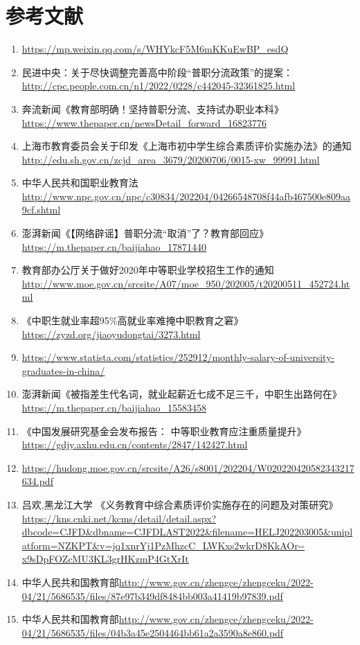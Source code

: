 \documentclass[12pt,UTF8]{ctexart}
\begin{document}
\section{参考文献}
\begin{enumerate}[1.]
	\item \url{https://mp.weixin.qq.com/s/WHYkcF5M6mKKuEwBP_esdQ}
	\item 民进中央：关于尽快调整完善高中阶段“普职分流政策”的提案：\url{http://cpc.people.com.cn/n1/2022/0228/c442045-32361825.html}
	\item 奔流新闻《教育部明确！坚持普职分流、支持试办职业本科》 \url{https://www.thepaper.cn/newsDetail_forward_16823776}
	\item 上海市教育委员会关于印发《上海市初中学生综合素质评价实施办法》的通知\url{http://edu.sh.gov.cn/zcjd_area_3679/20200706/0015-xw_99991.html}
	\item 中华人民共和国职业教育法\url{http://www.npc.gov.cn/npc/c30834/202204/04266548708f44afb467500e809aa9cf.shtml}
	\item 澎湃新闻《【网络辟谣】普职分流“取消”了？教育部回应》\url{https://m.thepaper.cn/baijiahao_17871440}
	\item 教育部办公厅关于做好2020年中等职业学校招生工作的通知\url{http://www.moe.gov.cn/srcsite/A07/moe_950/202005/t20200511_452724.html}
	\item 《中职生就业率超95\%高就业率难掩中职教育之窘》\url{https://zyzd.org/jiaoyudongtai/3273.html}
	\item \url{https://www.statista.com/statistics/252912/monthly-salary-of-university-graduates-in-china/}
	\item 澎湃新闻《被指差生代名词，就业起薪近七成不足三千，中职生出路何在》\url{https://m.thepaper.cn/baijiahao_15583458}
	\item 《中国发展研究基金会发布报告： 中等职业教育应注重质量提升》 \url{https://gdjy.axhu.edu.cn/contents/2847/142427.html}
	\item \url{https://hudong.moe.gov.cn/srcsite/A26/s8001/202204/W020220420582343217634.pdf}
	\item 吕欢,黑龙江大学 《义务教育中综合素质评价实施存在的问题及对策研究》\url{https://kns.cnki.net/kcms/detail/detail.aspx?dbcode=CJFD&dbname=CJFDLAST2022&filename=HELJ202203005&uniplatform=NZKPT&v=jq1xnrYj1PzMhzcC_LWKxs2wkrD8KkAOr--x9sDpFOZcMU3KL3grHKzmP4GtXrIt}
	\item 中华人民共和国教育部\url{http://www.gov.cn/zhengce/zhengceku/2022-04/21/5686535/files/87e97b349df8484bb003a41419b97839.pdf}
	\item 中华人民共和国教育部\url{http://www.gov.cn/zhengce/zhengceku/2022-04/21/5686535/files/04b3a45e2504464bb61a2a3590a8e860.pdf}

\end{enumerate}
\end{document}
